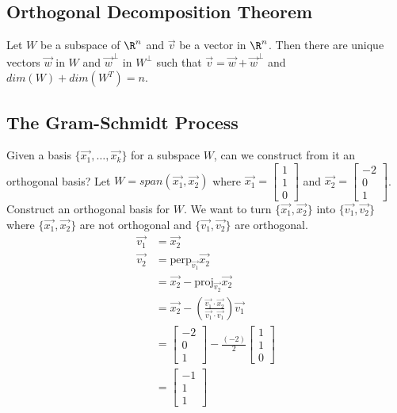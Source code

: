 \documentclass{math}
\begin{document}
\subsection*{Orthogonal Decomposition Theorem}
Let \( W \) be a subspace of \( \R^n \) and \( \vec{v} \) be a vector in
\( \R^n \). Then there are unique vectors \( \vec{w} \) in \( W \) and
\( \vec{w}^{\bot} \) in \( W^{\bot} \) such that \( \vec{v} =
\vec{w}+\vec{w}^{\bot} \) and \( dim(W)+dim(W^T) = n \).

\subsection*{The Gram-Schmidt Process}
Given a basis \( \{\vec{x_1},\dots,\vec{x_k}\} \) for a subspace \( W \), can we
construct from it an orthogonal basis? Let \( W = span(\vec{x_1},\vec{x_2}) \)
where \( \vec{x_1} = \begin{bmatrix} 1 \\ 1 \\ 0\end{bmatrix} \) and
\( \vec{x_2} = \begin{bmatrix}-2 \\ 0 \\ 1\end{bmatrix} \). Construct an
orthogonal basis for \( W \). We want to turn \( \{\vec{x_1},\vec{x_2}\} \)
into \( \{\vec{v_1},\vec{v_2}\} \) where \( \{\vec{x_1},\vec{x_2}\} \) are not
orthogonal and \( \{\vec{v_1},\vec{v_2}\} \) are orthogonal.
\begin{align*}
  \vec{v_1} &= \vec{x_2} \\
  \vec{v_2} &= \text{perp}_{\vec{v_1}}\vec{x_2} \\
  &= \vec{x_2}-\text{proj}_{\vec{v_2}}\vec{x_2} \\
  &= \vec{x_2}-\left(\frac{\vec{v_1}\cdot\vec{x_2}}{\vec{v_1}\cdot\vec{v_1}}
    \right)\vec{v_1} \\
  &= \begin{bmatrix}-2 \\ 0 \\ 1\end{bmatrix}-\frac{(-2)}{2}\begin{bmatrix}
    1 \\ 1 \\ 0\end{bmatrix} \\
  &= \begin{bmatrix}-1 \\ 1 \\ 1\end{bmatrix}
\end{align*}
\end{document}
